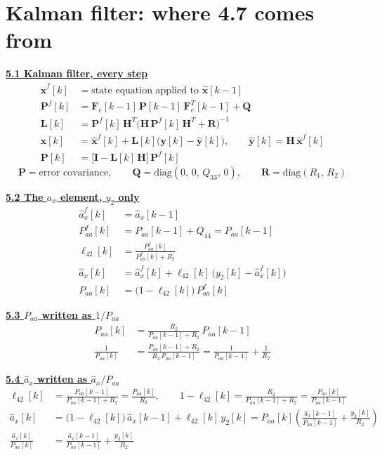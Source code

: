 \documentclass[11pt,a4paper]{ctexart}
\newcommand{\hd}[1]{\par\bigskip\noindent\underline{\textbf{#1}}}
\begin{document}
\clearpage
\section{Kalman filter: where 4.7 comes from}

\hd{5.1 Kalman filter, every step}
\[
\begin{aligned}
\hat{\mathbf{x}}^f[k] &= \text{state equation applied to } \hat{\mathbf{x}}[k-1] \\
\mathbf{P}^f[k] &= \mathbf{F}_e[k-1]\,\mathbf{P}[k-1]\,\mathbf{F}_e^T[k-1] + \mathbf{Q} \\
\mathbf{L}[k] &= \mathbf{P}^f[k]\,\mathbf{H}^T\big(\mathbf{H}\,\mathbf{P}^f[k]\,\mathbf{H}^T + \mathbf{R}\big)^{-1} \\
\hat{\mathbf{x}}[k] &= \hat{\mathbf{x}}^f[k] + \mathbf{L}[k]\big(\mathbf{y}[k] - \hat{\mathbf{y}}[k]\big), \qquad \hat{\mathbf{y}}[k] = \mathbf{H}\,\hat{\mathbf{x}}^f[k] \\
\mathbf{P}[k] &= \big[\mathbf{I} - \mathbf{L}[k]\,\mathbf{H}\big]\,\mathbf{P}^f[k]
\end{aligned}
\]
\[
\mathbf{P} = \text{error covariance}, \qquad
\mathbf{Q} = \mathrm{diag}(0,\, 0,\, Q_{33},\, 0), \qquad
\mathbf{R} = \mathrm{diag}(R_1,\, R_2)
\]

\hd{5.2 The $a_x$ element, $y_2$ only}
\[
\begin{aligned}
\hat a_x^f[k] &= \hat a_x[k-1] \\
P^f_{aa}[k] &= P_{aa}[k-1] + Q_{44} = P_{aa}[k-1] \\
\ell_{42}[k] &= \frac{P^f_{aa}[k]}{P^f_{aa}[k] + R_2} \\
\hat a_x[k] &= \hat a_x^f[k] + \ell_{42}[k]\,\big(y_2[k] - \hat a_x^f[k]\big) \\
P_{aa}[k] &= \big(1 - \ell_{42}[k]\big)\,P^f_{aa}[k]
\end{aligned}
\]

\hd{5.3 $P_{aa}$ written as $1/P_{aa}$}
\[
\begin{aligned}
P_{aa}[k] &= \frac{R_2}{P_{aa}[k-1] + R_2}\,P_{aa}[k-1] \\
\frac{1}{P_{aa}[k]} &= \frac{P_{aa}[k-1] + R_2}{R_2\,P_{aa}[k-1]} = \frac{1}{P_{aa}[k-1]} + \frac{1}{R_2}
\end{aligned}
\]

\hd{5.4 $\hat a_x$ written as $\hat a_x / P_{aa}$}
\[
\begin{aligned}
\ell_{42}[k] &= \frac{P_{aa}[k-1]}{P_{aa}[k-1] + R_2} = \frac{P_{aa}[k]}{R_2}, \qquad
1 - \ell_{42}[k] = \frac{R_2}{P_{aa}[k-1] + R_2} = \frac{P_{aa}[k]}{P_{aa}[k-1]} \\
\hat a_x[k] &= \big(1 - \ell_{42}[k]\big)\,\hat a_x[k-1] + \ell_{42}[k]\,y_2[k]
= P_{aa}[k]\left(\frac{\hat a_x[k-1]}{P_{aa}[k-1]} + \frac{y_2[k]}{R_2}\right) \\
\frac{\hat a_x[k]}{P_{aa}[k]} &= \frac{\hat a_x[k-1]}{P_{aa}[k-1]} + \frac{y_2[k]}{R_2}
\end{aligned}
\]
\end{document}
